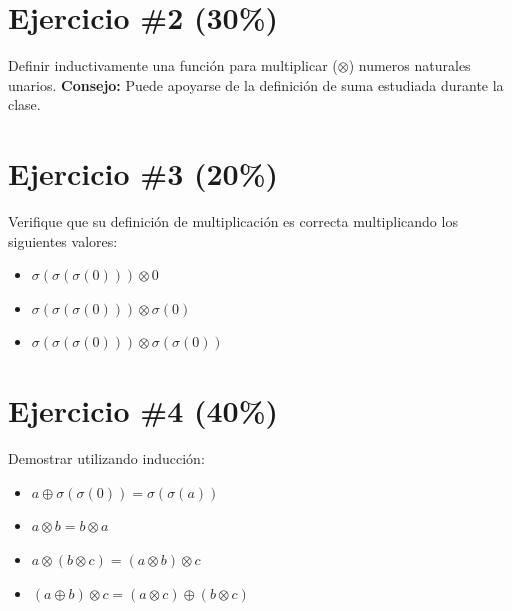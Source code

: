 \documentclass{article}
\newcommand{\perlscript}[2]{
\begin{itemize}
\item[]
\end{itemize}
}
\begin{document}
\section*{Ejercicio \#2 (30\%)}
Definir inductivamente una funci\'on para multiplicar ($\otimes$) numeros naturales unarios.
{\bf Consejo: }Puede apoyarse de la definici\'on de suma estudiada durante la
clase.

\section*{Ejercicio \#3 (20\%)}
Verifique que su definici\'on de multiplicaci\'on es correcta multiplicando los siguientes valores:
\begin{itemize}
        \item{$\sigma(\sigma(\sigma(0)))\otimes 0$}
        \item{$\sigma(\sigma(\sigma(0)))\otimes \sigma(0)$}
        \item{$\sigma(\sigma(\sigma(0)))\otimes \sigma(\sigma(0))$}
\end{itemize}

\section*{Ejercicio \#4 (40\%)}
Demostrar utilizando inducci\'on:
\begin{itemize}
        \item{$a\oplus \sigma(\sigma(0))=\sigma(\sigma(a))$}
        \item{$a \otimes b = b \otimes a$}
        \item{$a \otimes (b \otimes c)=(a\otimes b)\otimes c$}
        \item{$(a\oplus b)\otimes c = (a\otimes c) \oplus (b \otimes c)$}
\end{itemize}

% 
% 
\end{document}

